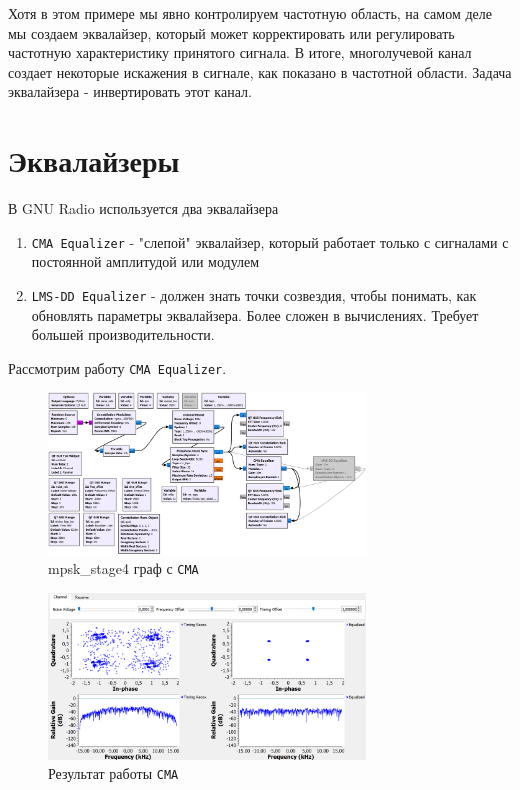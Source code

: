 \documentclass[a4paper,12pt]{article}
\begin{document}
	Хотя в этом примере мы явно контролируем частотную область, на самом деле мы создаем эквалайзер, который может корректировать или регулировать частотную характеристику принятого сигнала. В итоге, многолучевой канал создает некоторые искажения в сигнале, как показано в частотной области. Задача эквалайзера - инвертировать этот канал.
	
	\newpage
	
	\section{Эквалайзеры}
	
	В GNU Radio используется два эквалайзера
	
	\begin{enumerate}
		
		\item
		
		\texttt{CMA Equalizer} - "слепой" эквалайзер, который работает только с сигналами с постоянной амплитудой или модулем
		
		\item
		
		\texttt{LMS-DD Equalizer} - должен знать точки созвездия, чтобы понимать, как обновлять параметры эквалайзера. Более сложен в вычислениях. Требует большей производительности.
		
	\end{enumerate}
	
	Рассмотрим работу \texttt{CMA Equalizer}. 
	
	\begin{figure}[H]
		\centering
		\includegraphics[width=0.75\textwidth]{5_1.png}
		\caption{mpsk\_stage4 граф с \texttt{CMA}}
		\label{fig:5.1}
	\end{figure}
	
	\begin{figure}[H]
		\centering
		\includegraphics[width=0.75\textwidth]{5_2.png}
		\caption{Результат работы \texttt{CMA}}
		\label{fig:5.2}
	\end{figure}
	
\end{document}
